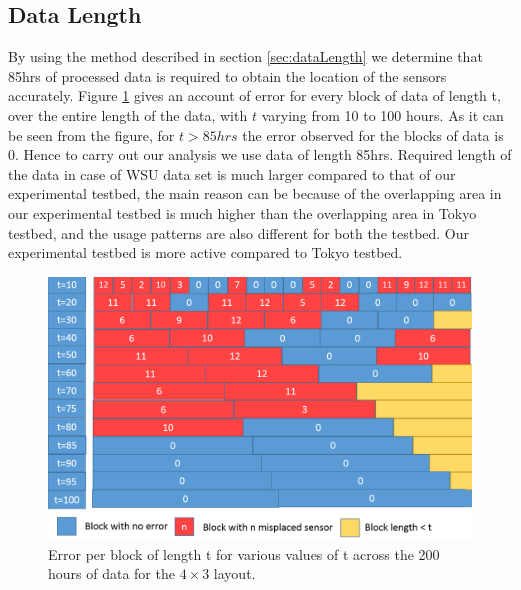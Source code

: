 \subsection{Data Length}
By using the method described in section \ref{sec:dataLength} we determine that 85hrs of processed data is required to obtain the location of the sensors accurately.  Figure \ref{fig:evst} gives an account of error for every block of data of length t, over the entire length of the data, with $t$ varying from 10 to 100 hours.
As it can be seen from the figure, for $t>85hrs$ the error observed for the blocks of data is 0. Hence to carry out our analysis we use data of length 85hrs. Required length of the data in case of WSU data set is much larger compared to that of our experimental testbed, the main reason can be because of the overlapping area in our experimental testbed is much higher than the overlapping area in Tokyo testbed, and the usage patterns are also different for both the testbed. Our experimental testbed is more active compared to Tokyo testbed.
\begin{figure}[!ht]
\includegraphics[scale=0.25]{./pics/errorvstime.png}
\caption{Error per block of length t for various values of t across the 200 hours of data for the $4 \times 3$ layout.}
\label{fig:evst}
\centering
\end{figure}


